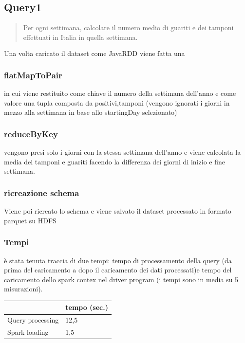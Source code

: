 \documentclass[acmsmall]{acmart}
\begin{document}
\subsection{Query1}
\begin{quote}
Per ogni settimana, calcolare il numero medio di guariti e dei tamponi effettuati in Italia in quella
settimana.\end{quote}

Una volta caricato il dataset come JavaRDD viene fatta una 

\subsubsection{flatMapToPair} 
in cui viene restituito 
come chiave il numero della settimana dell'anno e come valore una tupla composta da positivi,tamponi (vengono ignorati i giorni in mezzo alla settimana in base allo startingDay selezionato)

\subsubsection{reduceByKey}
vengono presi solo i giorni con la stessa settimana dell'anno e viene calcolata la media dei tamponi e guariti facendo la differenza dei giorni di inizio e fine settimana.
\subsubsection{ricreazione schema}
Viene poi ricreato lo schema e viene salvato il dataset processato in formato parquet su HDFS

\subsubsection{Tempi}
è stata tenuta traccia di due tempi: tempo di processamento della query (da prima del caricamento a dopo il caricamento dei dati processati)e tempo del caricamento dello spark contex nel driver program (i tempi sono in media su 5 misurazioni).

\hspace{40mm} \begin{tabular}{l|l|}
\cline{2-2}
                                       & tempo (sec.) \\ \hline
\multicolumn{1}{|l|}{Query processing} &   12,5         \\ \hline
\multicolumn{1}{|l|}{Spark loading}    &   1,5           \\ \hline
\end{tabular}
\end{document}
